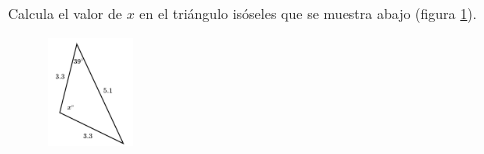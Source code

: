 \question[15]  Calcula el valor de $x$ en el triángulo isóseles  que se muestra abajo (figura \ref{fig:findangle07}).
\begin{figure}[H]
    \begin{center}
        \includegraphics[width=0.2\textwidth]{../images/findangle07.png}
    \end{center}
    \caption{}
    \label{fig:findangle07}
\end{figure}